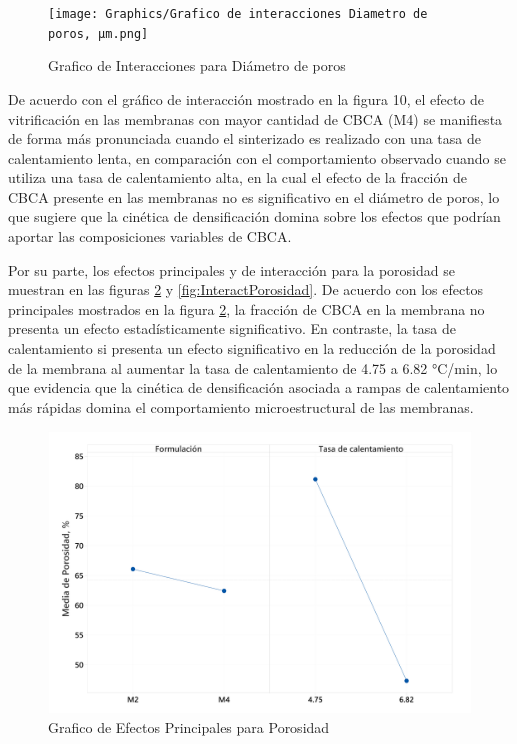 \documentclass{article}
\begin{document}
\begin{figure}[!htbp]
    \centering
    \texttt{[image: Graphics/Grafico de interacciones Diametro de poros, μm.png]}
    \caption{Grafico de Interacciones para Diámetro de poros}
    \label{fig:InteractDiametroPoros}
\end{figure}

De acuerdo con el gráfico de interacción mostrado en la figura 10, 
el efecto de vitrificación en las membranas con mayor cantidad de 
CBCA (M4) se manifiesta de forma más pronunciada cuando el 
sinterizado es realizado con una tasa de calentamiento lenta, 
en comparación con el comportamiento observado cuando se utiliza una 
tasa de calentamiento alta, en la cual el efecto de la fracción de 
CBCA presente en las membranas no es significativo en el diámetro de 
poros, lo que sugiere que la cinética de densificación domina sobre 
los efectos que podrían aportar las composiciones variables de CBCA. 

Por su parte, los efectos principales y de interacción para la porosidad 
se muestran en las figuras \ref{fig:EfectosPrinPorosidad} y \ref{fig:InteractPorosidad}. 
De acuerdo con los efectos principales mostrados en la figura \ref{fig:EfectosPrinPorosidad}, 
la fracción de CBCA en la membrana no presenta un efecto 
estadísticamente significativo. 
En contraste, la tasa de calentamiento si presenta un efecto 
significativo en la reducción de la porosidad de la membrana al 
aumentar la tasa de calentamiento de 4.75 a 6.82 °C/min, lo que 
evidencia que la cinética de densificación asociada a rampas de 
calentamiento más rápidas domina el comportamiento microestructural 
de las membranas.

\begin{figure}[!htbp]
    \centering
    \includegraphics[width=0.7\linewidth]{Graphics/Grafico de efectos principales de Porosidad.png}
    \caption{Grafico de Efectos Principales para Porosidad}
    \label{fig:EfectosPrinPorosidad}
\end{figure}
\end{document}
